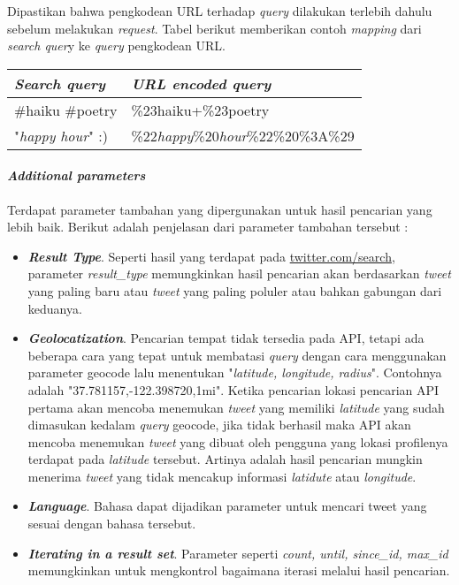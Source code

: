 Dipastikan bahwa pengkodean URL terhadap \textit{query} dilakukan terlebih dahulu sebelum melakukan \textit{request}. Tabel berikut memberikan contoh \textit{mapping} dari \textit{search quer}y ke \textit{query} pengkodean URL.

\begin{table}[h]
\begin{tabular}{|l|l|}
\hline
\textbf{\textit{Search query}}     & \textbf{\textit{URL encoded query}}                 \\ \hline
\#haiku \#poetry & \%23haiku+\%23poetry              \\
"\textit{happy hour}" :)  & \%22\textit{happy}\%20\textit{hour}\%22\%20\%3A\%29 \\ \hline
\end{tabular}
\end{table}

\paragraph{\textit{Additional parameters}}
Terdapat parameter tambahan yang dipergunakan untuk hasil pencarian yang lebih baik. Berikut adalah penjelasan dari parameter tambahan tersebut :

\begin{itemize}
	\item \textbf{\textit{Result Type}}. Seperti hasil yang terdapat pada \url{twitter.com/search}, parameter \textit{result\_type} memungkinkan hasil pencarian akan berdasarkan \textit{tweet} yang paling baru atau \textit{tweet} yang paling poluler atau bahkan gabungan dari keduanya.
	\item \textit{\textbf{Geolocatization}}. Pencarian tempat tidak tersedia pada API, tetapi ada beberapa cara yang tepat untuk membatasi \textit{query} dengan cara menggunakan parameter geocode lalu menentukan "\textit{latitude, longitude, radius}". Contohnya adalah "37.781157,-122.398720,1mi". Ketika pencarian lokasi pencarian API pertama akan mencoba menemukan \textit{tweet} yang memiliki \textit{latitude} yang sudah dimasukan kedalam \textit{query} geocode, jika tidak berhasil maka API akan mencoba menemukan \textit{tweet} yang dibuat oleh pengguna yang lokasi profilenya terdapat pada \textit{latitude} tersebut. Artinya adalah hasil pencarian mungkin menerima \textit{tweet} yang tidak mencakup informasi \textit{latidute} atau \textit{longitude}.
	\item \textit{\textbf{Language}}. Bahasa dapat dijadikan parameter untuk mencari tweet yang sesuai dengan bahasa tersebut.
	\item \textbf{\textit{Iterating in a result set}}. Parameter seperti \textit{count, until, since\_id, max\_id} memungkinkan untuk mengkontrol bagaimana iterasi melalui hasil pencarian.
\end{itemize}


